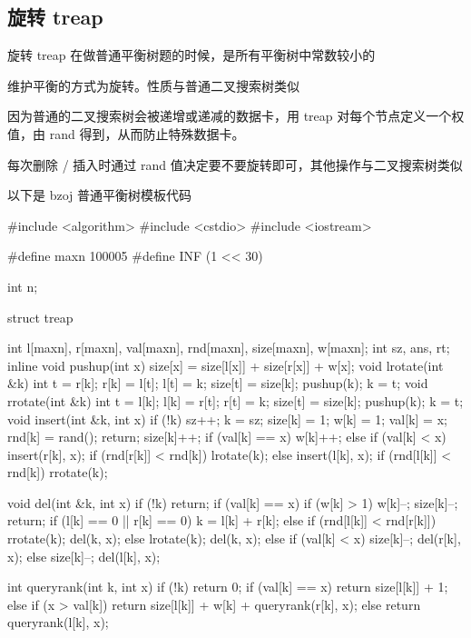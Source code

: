 \subsection{旋转 treap}

旋转 treap 在做普通平衡树题的时候，是所有平衡树中常数较小的

维护平衡的方式为旋转。性质与普通二叉搜索树类似

因为普通的二叉搜索树会被递增或递减的数据卡，用 treap 对每个节点定义一个权值，由 rand 得到，从而防止特殊数据卡。

每次删除 / 插入时通过 rand 值决定要不要旋转即可，其他操作与二叉搜索树类似

以下是 bzoj 普通平衡树模板代码

\begin{cppcode}
#include <algorithm>
#include <cstdio>
#include <iostream>

#define maxn 100005
#define INF (1 << 30)

int n;

struct treap {
  int l[maxn], r[maxn], val[maxn], rnd[maxn], size[maxn], w[maxn];
  int sz, ans, rt;
  inline void pushup(int x) { size[x] = size[l[x]] + size[r[x]] + w[x]; }
  void lrotate(int &k) {
    int t = r[k];
    r[k] = l[t];
    l[t] = k;
    size[t] = size[k];
    pushup(k);
    k = t;
  }
  void rrotate(int &k) {
    int t = l[k];
    l[k] = r[t];
    r[t] = k;
    size[t] = size[k];
    pushup(k);
    k = t;
  }
  void insert(int &k, int x) {
    if (!k) {
      sz++;
      k = sz;
      size[k] = 1;
      w[k] = 1;
      val[k] = x;
      rnd[k] = rand();
      return;
    }
    size[k]++;
    if (val[k] == x) {
      w[k]++;
    } else if (val[k] < x) {
      insert(r[k], x);
      if (rnd[r[k]] < rnd[k]) lrotate(k);
    } else {
      insert(l[k], x);
      if (rnd[l[k]] < rnd[k]) rrotate(k);
    }
  }

  void del(int &k, int x) {
    if (!k) return;
    if (val[k] == x) {
      if (w[k] > 1) {
        w[k]--;
        size[k]--;
        return;
      }
      if (l[k] == 0 || r[k] == 0)
        k = l[k] + r[k];
      else if (rnd[l[k]] < rnd[r[k]]) {
        rrotate(k);
        del(k, x);
      } else {
        lrotate(k);
        del(k, x);
      }
    } else if (val[k] < x) {
      size[k]--;
      del(r[k], x);
    } else {
      size[k]--;
      del(l[k], x);
    }
  }

  int queryrank(int k, int x) {
    if (!k) return 0;
    if (val[k] == x)
      return size[l[k]] + 1;
    else if (x > val[k]) {
      return size[l[k]] + w[k] + queryrank(r[k], x);
    } else
      return queryrank(l[k], x);
  }

}
\end{cppcode}
